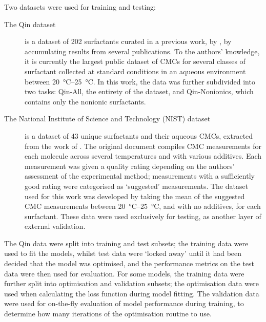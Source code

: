 \newcommand{\lrv}{\vec{v}^{\,(p)}}

Two datasets were used for training and testing:

\begin{description}
    \item[The Qin dataset] is a dataset of 202 surfactants curated in a
        previous work, by \citet{qinPredictingCriticalMicelle2021}, by
        accumulating results from several publications. To the authors'
        knowledge, it is currently the largest public dataset of CMCs for
        several classes of surfactant collected at standard conditions in an
        aqueous environment between \SIrange{20}{25}{\celsius}. In this work,
        the data was further subdivided into two tasks: Qin-All, the entirety of
        the dataset, and Qin-Nonionics, which contains only the nonionic
        surfactants.
    \item[The National Institute of Science and Technology (NIST) dataset] is a
        dataset of 43 unique surfactants and their aqueous CMCs, extracted from
        the work of \citet{mukerjeeCriticalMicelleConcentrations1971}. The
        original document compiles CMC measurements for each molecule across
        several temperatures and with various additives. Each measurement was
        given a quality rating depending on the authors' assessment of the
        experimental method; measurements with a sufficiently good rating were
        categorised as `suggested' measurements. The dataset used for this work
        was developed by taking the mean of the suggested CMC measurements
        between \SIrange{20}{25}{\degreeCelsius}, and with no additives, for
        each surfactant. These data were used exclusively for testing, as
        another layer of external validation.
\end{description}

The Qin data \cite{qinPredictingCriticalMicelle2021} were split into training
and test subsets; the training data were used to fit the models, whilst test
data were `locked away' until it had been decided that the model was optimised,
and the performance metrics on the test data were then used for evaluation. For
some models, the training data were further split into optimisation and
validation subsets; the optimisation data were used when calculating the loss
function during model fitting. The validation data were used for on-the-fly
evaluation of model performance during training, to determine how many
iterations of the optimisation routine to use.


